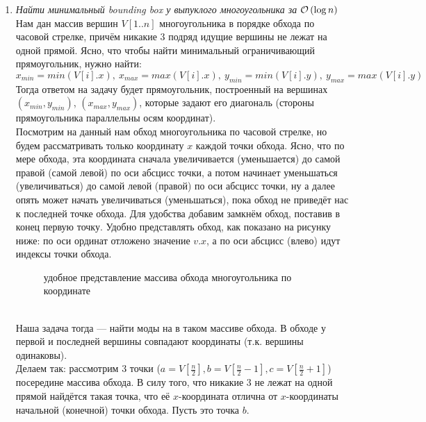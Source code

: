 \begin{enumerate}[label={\textbf{(\alph*)}}]
\item \textit{Найти минимальный bounding box у выпуклого многоугольника за $\mathcal{O}\left(\log{n}\right)$}\\
Нам дан массив вершин $V[1..n]$ многоугольника в порядке обхода по часовой стрелке, причём никакие 3 
подряд идущие вершины не лежат на одной прямой. Ясно, что чтобы найти минимальный ограничивающий прямоугольник, нужно найти:
\[ x_{min}=min(V[i].x),\ x_{max}=max(V[i].x),\ y_{min}=min(V[i].y),\ y_{max}=max(V[i].y) \]
Тогда ответом на задачу будет прямоугольник, построенный на вершинах $(x_{min}, y_{min})$, 
$(x_{max},y_{max})$,
которые задают его диагональ (стороны прямоугольника параллельны осям координат).\\
Посмотрим на данный нам обход многоугольника по часовой стрелке, но будем рассматривать только
координату $x$ каждой точки обхода. Ясно, что по мере обхода, эта координата сначала увеличивается (уменьшается) до самой правой (самой левой) по оси абсцисс точки, а потом начинает уменьшаться (увеличиваться)
до самой левой (правой) по оси абсцисс точки, ну а далее опять может начать увеличиваться (уменьшаться), пока обход не приведёт нас к последней точке обхода. Для удобства добавим замкнём обход, поставив в конец первую точку. Удобно представлять обход, как показано на рисунку ниже: по оси ординат отложено значение $v.x$, а по 
оси абсцисс (влево) идут индексы точки обхода.
\begin{figure}[ht!]
\centering
{}
\caption{удобное представление массива обхода многоугольника по координате}
\end{figure}\\
Наша задача тогда --- найти моды на в таком массиве обхода. В обходе у первой и последней вершины
совпадают координаты (т.к. вершины одинаковы).\\
Делаем так: рассмотрим $3$ точки ($a=V[\frac{n}{2}],b=V[\frac{n}{2}-1],c=V[\frac{n}{2}+1]$) посередине массива обхода. В силу того, что никакие $3$ не лежат на одной прямой найдётся такая точка, что её 
$x$-координата отлична от $x$-координаты начальной (конечной) точки обхода. Пусть это точка $b$.

\end{enumerate}
